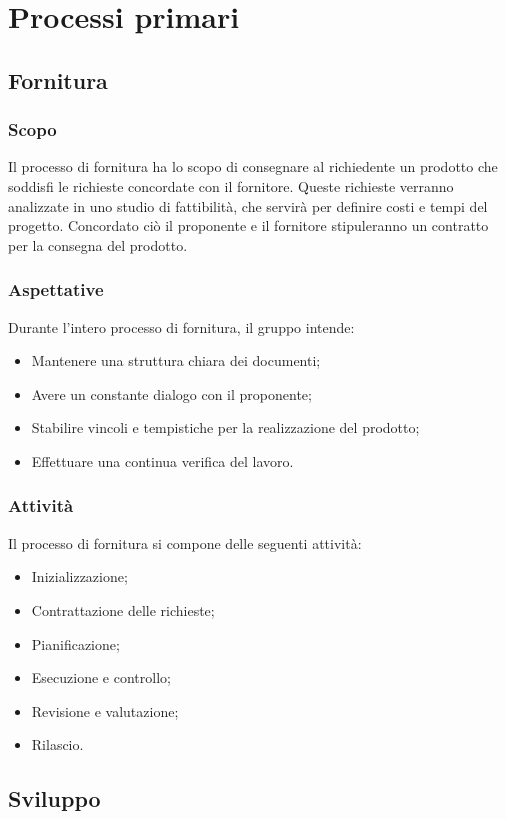 \chapter{Processi primari}

\section{Fornitura}
\subsection{Scopo}
Il processo di fornitura ha lo scopo di consegnare al richiedente un prodotto che soddisfi le richieste concordate con il fornitore.
Queste richieste verranno analizzate in uno studio di fattibilità, che servirà per definire costi e tempi del progetto. Concordato ciò il proponente e il fornitore stipuleranno un contratto per la consegna del prodotto.

\subsection{Aspettative}
Durante l’intero processo di fornitura, il gruppo intende:
\begin{itemize}
    \item Mantenere una struttura chiara dei documenti;
    \item Avere un constante dialogo con il proponente;
    \item Stabilire vincoli e tempistiche per la realizzazione del prodotto;
    \item Effettuare una continua verifica del lavoro.
\end{itemize}

\subsection{Attività}
Il processo di fornitura si compone delle seguenti attività:
\begin{itemize}
    \item Inizializzazione;
    \item Contrattazione delle richieste;
    \item Pianificazione;
    \item Esecuzione e controllo;
    \item Revisione e valutazione;
    \item Rilascio.
\end{itemize}

\section{Sviluppo}

